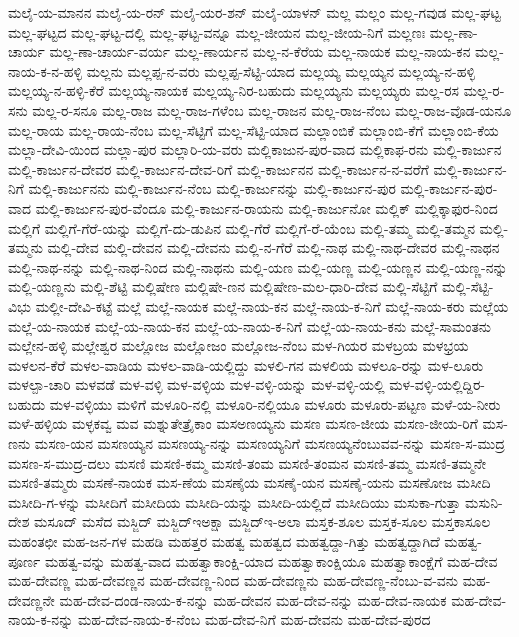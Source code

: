 ಮಲೈ-ಯ-ಮಾನನ
ಮಲೈ-ಯ-ರನ್
ಮಲೈ-ಯರ-ಶನ್
ಮಲೈ-ಯಾಳನ್
ಮಲ್ಲ
ಮಲ್ಲಂ
ಮಲ್ಲ-ಗವುಡ
ಮಲ್ಲ-ಘಟ್ಟ
ಮಲ್ಲ-ಘಟ್ಟದ
ಮಲ್ಲ-ಘಟ್ಟ-ದಲ್ಲಿ
ಮಲ್ಲ-ಘಟ್ಟ-ವನ್ನೂ
ಮಲ್ಲ-ಜೀಯನ
ಮಲ್ಲ-ಜೀಯ-ನಿಗೆ
ಮಲ್ಲಣಃ
ಮಲ್ಲ-ಣಾ-ಚಾರ್ಯ
ಮಲ್ಲ-ಣಾ-ಚಾರ್ಯ-ವರ್ಯ
ಮಲ್ಲ-ಣಾರ್ಯನ
ಮಲ್ಲ-ನ-ಕೆರೆಯ
ಮಲ್ಲ-ನಾಯಕ
ಮಲ್ಲ-ನಾಯ-ಕನ
ಮಲ್ಲ-ನಾಯ-ಕ-ನ-ಹಳ್ಳಿ
ಮಲ್ಲನು
ಮಲ್ಲಪ್ಪ-ನ-ವರು
ಮಲ್ಲಪ್ಪ-ಸೆಟ್ಟಿ-ಯಾದ
ಮಲ್ಲಯ್ಯ
ಮಲ್ಲಯ್ಯನ
ಮಲ್ಲಯ್ಯ-ನ-ಹಳ್ಳಿ
ಮಲ್ಲಯ್ಯ-ನ-ಹಳ್ಳಿ-ಕೆರೆ
ಮಲ್ಲಯ್ಯ-ನಾಯಕ
ಮಲ್ಲಯ್ಯ-ನಿರ-ಬಹುದು
ಮಲ್ಲಯ್ಯನು
ಮಲ್ಲಯ್ಯರು
ಮಲ್ಲ-ರಸ
ಮಲ್ಲ-ರ-ಸನು
ಮಲ್ಲ-ರ-ಸನೂ
ಮಲ್ಲ-ರಾಜ
ಮಲ್ಲ-ರಾಜ-ಗಳೆಂಬ
ಮಲ್ಲ-ರಾಜನ
ಮಲ್ಲ-ರಾಜ-ನೆಂಬ
ಮಲ್ಲ-ರಾಜ-ವೊಡ-ಯನೂ
ಮಲ್ಲ-ರಾಯ
ಮಲ್ಲ-ರಾಯ-ನೆಂಬ
ಮಲ್ಲ-ಸೆಟ್ಟಿಗೆ
ಮಲ್ಲ-ಸೆಟ್ಟಿ-ಯಾದ
ಮಲ್ಲಾಂಬಿಕೆ
ಮಲ್ಲಾಂಬಿ-ಕೆಗೆ
ಮಲ್ಲಾಂಬಿ-ಕೆಯ
ಮಲ್ಲಾ-ದೇವಿ-ಯಿಂದ
ಮಲ್ಲಾ-ಪುರ
ಮಲ್ಲಾರಿ-ಯ-ವರು
ಮಲ್ಲಿಕಾಜುನ-ಪುರ-ವಾದ
ಮಲ್ಲಿಕಾಫ-ರನು
ಮಲ್ಲಿ-ಕಾರ್ಜುನ
ಮಲ್ಲಿ-ಕಾರ್ಜುನ-ದೇವರ
ಮಲ್ಲಿ-ಕಾರ್ಜುನ-ದೇವ-ರಿಗೆ
ಮಲ್ಲಿ-ಕಾರ್ಜುನನ
ಮಲ್ಲಿ-ಕಾರ್ಜುನ-ನ-ವರೆಗೆ
ಮಲ್ಲಿ-ಕಾರ್ಜುನ-ನಿಗೆ
ಮಲ್ಲಿ-ಕಾರ್ಜುನನು
ಮಲ್ಲಿ-ಕಾರ್ಜುನ-ನೆಂಬ
ಮಲ್ಲಿ-ಕಾರ್ಜುನನ್ನು
ಮಲ್ಲಿ-ಕಾರ್ಜುನ-ಪುರ
ಮಲ್ಲಿ-ಕಾರ್ಜುನ-ಪುರ-ವಾದ
ಮಲ್ಲಿ-ಕಾರ್ಜುನ-ಪುರ-ವೆಂದೂ
ಮಲ್ಲಿ-ಕಾರ್ಜುನ-ರಾಯನು
ಮಲ್ಲಿ-ಕಾರ್ಜುನೋ
ಮಲ್ಲಿಕ್
ಮಲ್ಲಿಕ್ಕಾಫುರ-ನಿಂದ
ಮಲ್ಲಿಗೆ
ಮಲ್ಲಿಗೆ-ಗೆರೆ-ಯನ್ನು
ಮಲ್ಲಿಗೆ-ದು-ಡುಪಿನ
ಮಲ್ಲಿ-ಗೆರೆ
ಮಲ್ಲಿಗೆ-ರೆ-ಯೆಂಬ
ಮಲ್ಲಿ-ತಮ್ಮ
ಮಲ್ಲಿ-ತಮ್ಮನ
ಮಲ್ಲಿ-ತಮ್ಮನು
ಮಲ್ಲಿ-ದೇವ
ಮಲ್ಲಿ-ದೇವನ
ಮಲ್ಲಿ-ದೇವನು
ಮಲ್ಲಿ-ನ-ಗೆರೆ
ಮಲ್ಲಿ-ನಾಥ
ಮಲ್ಲಿ-ನಾಥ-ದೇವರ
ಮಲ್ಲಿ-ನಾಥನ
ಮಲ್ಲಿ-ನಾಥ-ನನ್ನು
ಮಲ್ಲಿ-ನಾಥ-ನಿಂದ
ಮಲ್ಲಿ-ನಾಥನು
ಮಲ್ಲಿ-ಯಣ
ಮಲ್ಲಿ-ಯಣ್ಣ
ಮಲ್ಲಿ-ಯಣ್ಣನ
ಮಲ್ಲಿ-ಯಣ್ಣ-ನನ್ನು
ಮಲ್ಲಿ-ಯಣ್ಣನು
ಮಲ್ಲಿ-ಶೆಟ್ಟಿ
ಮಲ್ಲಿಷೇಣ
ಮಲ್ಲಿಷೇ-ಣನ
ಮಲ್ಲಿಷೇಣ-ಮಲ-ಧಾರಿ-ದೇವ
ಮಲ್ಲಿ-ಸೆಟ್ಟಿಗೆ
ಮಲ್ಲಿ-ಸೆಟ್ಟಿ-ವಿಭು
ಮಲ್ಲೀ-ದೇವಿ-ಕಟ್ಟೆ
ಮಲ್ಲೆ
ಮಲ್ಲೆ-ನಾಯಕ
ಮಲ್ಲೆ-ನಾಯ-ಕನ
ಮಲ್ಲೆ-ನಾಯ-ಕ-ನಿಗೆ
ಮಲ್ಲೆ-ನಾಯ-ಕರು
ಮಲ್ಲೆಯ
ಮಲ್ಲೆ-ಯ-ನಾಯಕ
ಮಲ್ಲೆ-ಯ-ನಾಯ-ಕನ
ಮಲ್ಲೆ-ಯ-ನಾಯ-ಕ-ನಿಗೆ
ಮಲ್ಲೆ-ಯ-ನಾಯ-ಕನು
ಮಲ್ಲೆ-ಸಾಮಂತನು
ಮಲ್ಲೇನ-ಹಳ್ಳಿ
ಮಲ್ಲೇಶ್ವರ
ಮಲ್ಲೋಜ
ಮಲ್ಲೋಜಂ
ಮಲ್ಲೋಜ-ನೆಂಬ
ಮಳ-ಗಿಯರ
ಮಳಬ್ರಯ
ಮಳಭ್ರಯ
ಮಳಲನ-ಕೆರೆ
ಮಳಲ-ವಾಡಿಯ
ಮಳಲ-ವಾಡಿ-ಯಲ್ಲಿದ್ದು
ಮಳಲಿ-ಗನ
ಮಳಲಿಯ
ಮಳಲೂ-ರನ್ನು
ಮಳ-ಲೂರು
ಮಳಲ್ಪಾ-ಚಾರಿ
ಮಳವಡೆ
ಮಳ-ವಳ್ಳಿ
ಮಳ-ವಳ್ಳಿಯ
ಮಳ-ವಳ್ಳಿ-ಯನ್ನು
ಮಳ-ವಳ್ಳಿ-ಯಲ್ಲಿ
ಮಳ-ವಳ್ಳಿ-ಯಲ್ಲಿದ್ದಿರ-ಬಹುದು
ಮಳ-ವಳ್ಳಿಯು
ಮಳಿಗೆ
ಮಳೂರಿ-ನಲ್ಲಿ
ಮಳೂರಿ-ನಲ್ಲಿಯೂ
ಮಳೂರು
ಮಳೂರು-ಪಟ್ಟಣ
ಮಳೆ-ಯ-ನೀರು
ಮಳೆ-ಹಳ್ಳಿಯ
ಮಳ್ಳಕವ್ವ
ಮವ
ಮಶ್ನುತೇತ್ರೈಕಾಂ
ಮಸಅಣಯ್ಯನು
ಮಸಣ
ಮಸಣ-ಜೀಯ
ಮಸಣ-ಜೀಯ-ರಿಗೆ
ಮಸ-ಣನು
ಮಸಣ-ಯನ
ಮಸಣಯ್ಯನ
ಮಸಣಯ್ಯ-ನನ್ನು
ಮಸಣಯ್ಯನಿಗೆ
ಮಸಣಯ್ಯನೆಂಬುವವ-ನನ್ನು
ಮಸಣ-ಸ-ಮುದ್ರ
ಮಸಣ-ಸ-ಮುದ್ರ-ದಲು
ಮಸಣಿ
ಮಸಣಿ-ಕಮ್ಮ
ಮಸಣಿ-ತಂಮ
ಮಸಣಿ-ತಂಮನ
ಮಸಣಿ-ತಮ್ಮ
ಮಸಣಿ-ತಮ್ಮನೇ
ಮಸಣಿ-ತಮ್ಮರು
ಮಸಣೆ-ನಾಯಕ
ಮಸ-ಣೆಯ
ಮಸಣೈಯ
ಮಸಣೈ-ಯನ
ಮಸಣೈ-ಯನು
ಮಸಣೋಜ
ಮಸೀದಿ
ಮಸೀದಿ-ಗ-ಳನ್ನು
ಮಸೀದಿಗೆ
ಮಸೀದಿಯ
ಮಸೀದಿ-ಯನ್ನು
ಮಸೀದಿ-ಯಲ್ಲಿದೆ
ಮಸೀದಿಯು
ಮಸುಕಾ-ಗುತ್ತಾ
ಮಸುನಿ-ದೇಶ
ಮಸೂದ್
ಮಸೆದ
ಮಸ್ಜಿದ್
ಮಸ್ಜಿದ್ಇಅಕ್ಷಾ
ಮಸ್ಜಿದ್ಇ-ಅಲಾ
ಮಸ್ತಕ-ಶೂಲ
ಮಸ್ತಕ-ಸೂಲ
ಮಸ್ತಕಾಸೂಲ
ಮಹಂತಛೀ
ಮಹ-ಜನ-ಗಳ
ಮಹಡಿ
ಮಹತ್ತರ
ಮಹತ್ವ
ಮಹತ್ವದ
ಮಹತ್ವದ್ದಾ-ಗಿತ್ತು
ಮಹತ್ವದ್ದಾಗಿದೆ
ಮಹತ್ವ-ಪೂರ್ಣ
ಮಹತ್ವ-ವನ್ನು
ಮಹತ್ವ-ವಾದ
ಮಹತ್ವಾಕಾಂಕ್ಷಿ-ಯಾದ
ಮಹತ್ವಾಕಾಂಕ್ಷಿಯೂ
ಮಹತ್ವಾಕಾಂಕ್ಷೆಗೆ
ಮಹ-ದೇವ
ಮಹ-ದೇವಣ್ಣ
ಮಹ-ದೇವಣ್ಣನ
ಮಹ-ದೇವಣ್ಣ-ನಿಂದ
ಮಹ-ದೇವಣ್ಣನು
ಮಹ-ದೇವಣ್ಣ-ನೆಂಬು-ವ-ವನು
ಮಹ-ದೇವಣ್ಣನೇ
ಮಹ-ದೇವ-ದಂಡ-ನಾಯ-ಕ-ನನ್ನು
ಮಹ-ದೇವನ
ಮಹ-ದೇವ-ನನ್ನು
ಮಹ-ದೇವ-ನಾಯಕ
ಮಹ-ದೇವ-ನಾಯ-ಕ-ನನ್ನು
ಮಹ-ದೇವ-ನಾಯ-ಕ-ನೆಂಬ
ಮಹ-ದೇವ-ನಿಗೆ
ಮಹ-ದೇವನು
ಮಹ-ದೇವ-ಪುರದ
